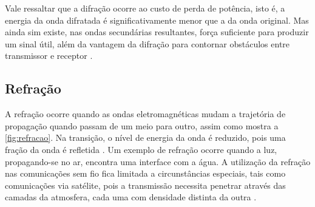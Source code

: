 Vale ressaltar que a difração ocorre ao custo de perda de potência, isto é, a energia da onda difratada é significativamente menor que a da onda original. Mas ainda sim existe, nas ondas secundárias resultantes, força suficiente para produzir um sinal útil, além da vantagem da difração para contornar obstáculos entre transmissor e receptor \cite{flickenger2008,rappaport2009}.

\subsection{Refração}
\label{sub:refracao}

A refração ocorre quando as ondas eletromagnéticas mudam a trajetória de propagação quando passam de um meio para outro, assim como mostra a \autoref{fig:refracao}. Na transição, o nível de energia da onda é reduzido, pois uma fração da onda é refletida \cite{flickenger2008}. Um exemplo de refração ocorre quando a luz, propagando-se no ar, encontra uma interface com a água. A utilização da refração nas comunicações sem fio fica limitada a circunstâncias especiais, tais como comunicações via satélite, pois a transmissão necessita penetrar através das camadas da atmosfera, cada uma com densidade distinta da outra \cite{rappaport2009}.

\begin{figure}[H]
	\centering
\end{figure}

